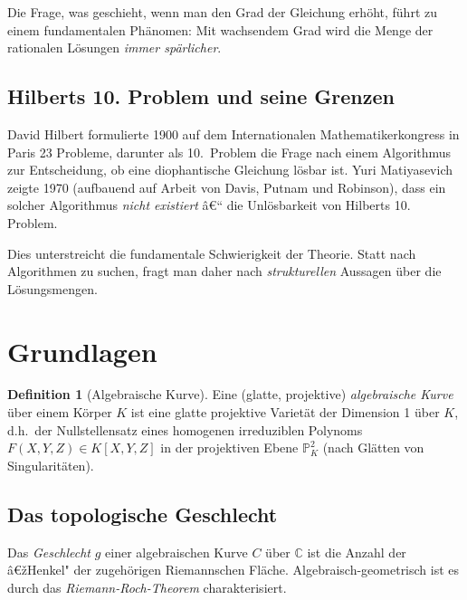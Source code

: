 ﻿\documentclass[12pt,a4paper]{article}
\theoremstyle{plain}
\theoremstyle{definition}
\newtheorem{definition}[theorem]{Definition}
\theoremstyle{remark}
\newcommand{\C}{\mathbb{C}}
\begin{document}
Die Frage, was geschieht, wenn man den Grad der Gleichung erhöht, führt zu einem
fundamentalen Phänomen: Mit wachsendem Grad wird die Menge der rationalen Lösungen
\emph{immer spärlicher}.

\subsection{Hilberts 10. Problem und seine Grenzen}

David Hilbert formulierte 1900 auf dem Internationalen Mathematikerkongress in Paris 23
Probleme, darunter als 10.\ Problem die Frage nach einem Algorithmus zur Entscheidung,
ob eine diophantische Gleichung lösbar ist. Yuri Matiyasevich zeigte 1970 (aufbauend
auf Arbeit von Davis, Putnam und Robinson), dass ein solcher Algorithmus \emph{nicht existiert} â€“
die Unlösbarkeit von Hilberts 10. Problem.

Dies unterstreicht die fundamentale Schwierigkeit der Theorie. Statt nach Algorithmen
zu suchen, fragt man daher nach \emph{strukturellen} Aussagen über die Lösungsmengen.

\section{Grundlagen}

\begin{definition}[Algebraische Kurve]\label{def:kurve}
Eine (glatte, projektive) \emph{algebraische Kurve} über einem Körper $K$ ist eine
glatte projektive Varietät der Dimension 1 über $K$, d.h.\ der Nullstellensatz eines
homogenen irreduziblen Polynoms $F(X,Y,Z) \in K[X,Y,Z]$ in der projektiven Ebene $\mathbb{P}^2_K$
(nach Glätten von Singularitäten).
\end{definition}

\subsection{Das topologische Geschlecht}

Das \emph{Geschlecht} $g$ einer algebraischen Kurve $C$ über $\C$ ist die Anzahl
der â€žHenkel" der zugehörigen Riemannschen Fläche. Algebraisch-geometrisch ist es
durch das \emph{Riemann-Roch-Theorem} charakterisiert.
\end{document}
